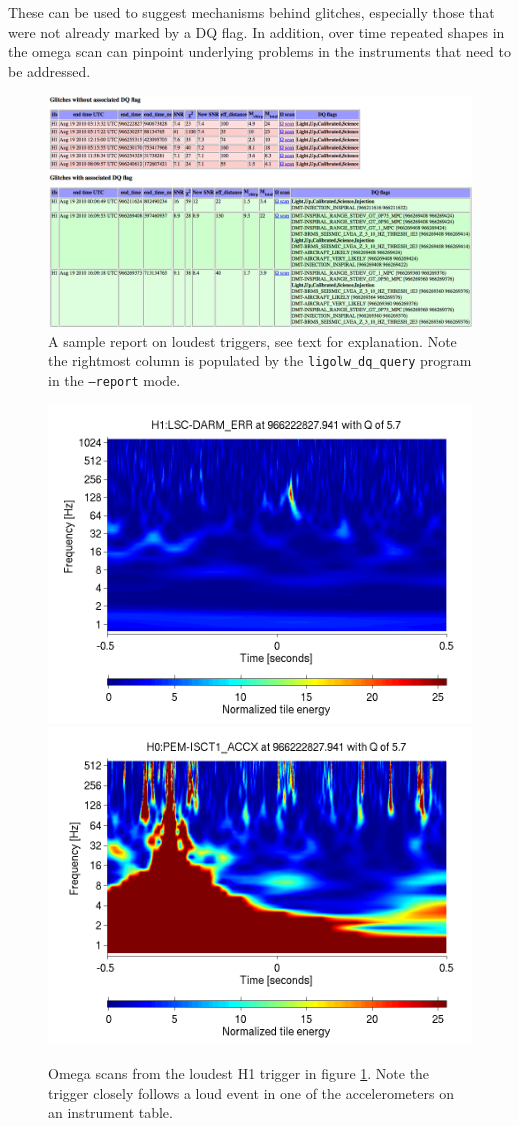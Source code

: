 These can be used to suggest mechanisms behind glitches, especially
those that were not already marked by a DQ flag.  In addition, over
time repeated shapes in the omega scan can pinpoint underlying
problems in the instruments that need to be addressed.

\begin{figure}
  \includegraphics[width=\linewidth]{figures/detchar/loudest.png}
  \caption[Sample loudest trigger report from Aug 19, 2010]{
  \label{f:daily_ihope_loudest}
A sample report on loudest triggers, see text for explanation.  Note the
rightmost column is populated by
the \texttt{ligolw\_dq\_query} program in the \texttt{--report} mode.}
\end{figure}%



\begin{figure}
  \includegraphics[width=0.5\linewidth]{figures/detchar/966222827_940673828_H1_LSC-DARM_ERR_1_00_spectrogram_whitened.png}
  \includegraphics[width=0.5\linewidth]{figures/detchar/966222827_940673828_H0_PEM-ISCT1_ACCX_1_00_spectrogram_whitened.png}
  \caption[Omega scans from the loudest H1 trigger in figure \ref{f:daily_ihope_loudest}]{
  \label{f:daily_ihope_loudest_omega}
Omega scans from the loudest H1 trigger in figure
\ref{f:daily_ihope_loudest}.
Note the trigger closely follows a loud
event in one of the accelerometers on an instrument table.}
\end{figure}%



